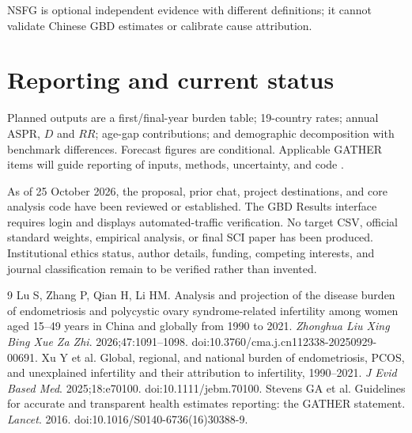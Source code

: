\documentclass[11pt,a4paper]{article}
\begin{document}
NSFG is optional independent evidence with different definitions; it cannot validate Chinese GBD estimates or calibrate cause attribution.

\section{Reporting and current status}
Planned outputs are a first/final-year burden table; 19-country rates; annual ASPR, $D$ and $RR$; age-gap contributions; and demographic decomposition with benchmark differences. Forecast figures are conditional. Applicable GATHER items will guide reporting of inputs, methods, uncertainty, and code \cite{gather}.

As of 25 October 2026, the proposal, prior chat, project destinations, and core analysis code have been reviewed or established. The GBD Results interface requires login and displays automated-traffic verification. No target CSV, official standard weights, empirical analysis, or final SCI paper has been produced. Institutional ethics status, author details, funding, competing interests, and journal classification remain to be verified rather than invented.

\small
\begin{thebibliography}{9}
 Lu S, Zhang P, Qian H, Li HM.
Analysis and projection of the disease burden of endometriosis and polycystic ovary syndrome-related infertility among women aged 15--49 years in China and globally from 1990 to 2021.
\emph{Zhonghua Liu Xing Bing Xue Za Zhi}. 2026;47:1091--1098.
doi:10.3760/cma.j.cn112338-20250929-00691.
 Xu Y et al.
Global, regional, and national burden of endometriosis, PCOS, and unexplained infertility and their attribution to infertility, 1990--2021.
\emph{J Evid Based Med}. 2025;18:e70100.
doi:10.1111/jebm.70100.
 Stevens GA et al.
Guidelines for accurate and transparent health estimates reporting: the GATHER statement.
\emph{Lancet}. 2016.
doi:10.1016/S0140-6736(16)30388-9.
\end{thebibliography}
\end{document}
